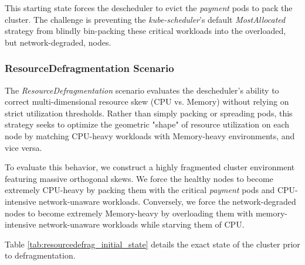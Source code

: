 This starting state forces the descheduler to evict the \textit{payment} pods to pack the cluster. The challenge is preventing the \textit{kube-scheduler}'s default \textit{MostAllocated} strategy from blindly bin-packing these critical workloads into the overloaded, but network-degraded, nodes.

\subsubsection{ResourceDefragmentation Scenario}
\label{subsubsec:netaware4_workload_imbalance}
The \textit{ResourceDefragmentation} scenario evaluates the descheduler's ability to correct multi-dimensional resource skew (CPU vs. Memory) without relying on strict utilization thresholds. Rather than simply packing or spreading pods, this strategy seeks to optimize the geometric "shape" of resource utilization on each node by matching CPU-heavy workloads with Memory-heavy environments, and vice versa.

To evaluate this behavior, we construct a highly fragmented cluster environment featuring massive orthogonal skews. We force the healthy nodes to become extremely CPU-heavy by packing them with the critical \textit{payment} pods and CPU-intensive network-unaware workloads. Conversely, we force the network-degraded nodes to become extremely Memory-heavy by overloading them with memory-intensive network-unaware workloads while starving them of CPU.

Table \ref{tab:resourcedefrag_initial_state} details the exact state of the cluster prior to defragmentation.

\begin{table}[H]
    \centering
    \caption{Resource Allocation: Initial State for ResourceDefragmentation Strategy}
    \label{tab:resourcedefrag_initial_state}
\end{table}

